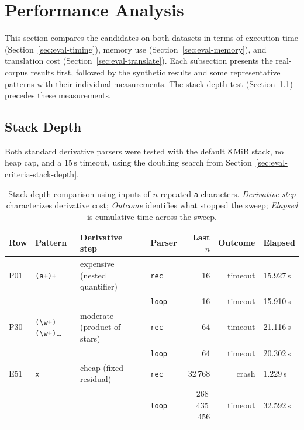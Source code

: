 %
%
%
%
%

\section{Performance Analysis}
\label{sec:eval-performance}

This section compares the candidates on both datasets in terms of
execution time (Section~\ref{sec:eval-timing}),
memory use (Section~\ref{sec:eval-memory}), and
translation cost (Section~\ref{sec:eval-translate}).
Each subsection presents the real-corpus results first,
followed by the synthetic results and
some representative patterns with their individual measurements.
The stack depth test (Section~\ref{sec:eval-stack-depth}) precedes these measurements.

%
%
%

\subsection{Stack Depth}
\label{sec:eval-stack-depth}

Both standard derivative parsers were tested with the
default $8\,\mathrm{MiB}$ stack, no heap cap, and a
$15\,\mathrm{s}$ timeout, using the doubling search
from Section~\ref{sec:eval-criteria-stack-depth}.

\begin{table}[H]
\centering
\small
\setlength{\tabcolsep}{4pt}
\begin{tabular*}{\textwidth}{@{\extracolsep{\fill}} llllrrl}
\hline
Row & Pattern & Derivative step & Parser & Last $n$ & Outcome & Elapsed \\
\hline
P01 & \texttt{(a+)+} & expensive (nested quantifier)
    & \texttt{rec}  & 16 & timeout & 15.927\,s \\
    & & & \texttt{loop} & 16 & timeout & 15.910\,s \\
\hline
P30 & \texttt{(\textbackslash w+)(\textbackslash w+)}\ldots
    & moderate (product of stars)
    & \texttt{rec}  & 64 & timeout & 21.116\,s \\
    & & & \texttt{loop} & 64 & timeout & 20.302\,s \\
\hline
E51 & \texttt{x} & cheap (fixed residual)
    & \texttt{rec}  & 32\,768 & crash & 1.229\,s \\
    & & & \texttt{loop} & 268\,435\,456 & timeout & 32.592\,s \\
\hline
\end{tabular*}
\caption{Stack-depth comparison using inputs of
$n$ repeated \texttt{a} characters.
\emph{Derivative step} characterizes derivative cost;
\emph{Outcome} identifies what stopped the sweep;
\emph{Elapsed} is cumulative time across the sweep.}
\label{tab:stack-depth}
\end{table}


